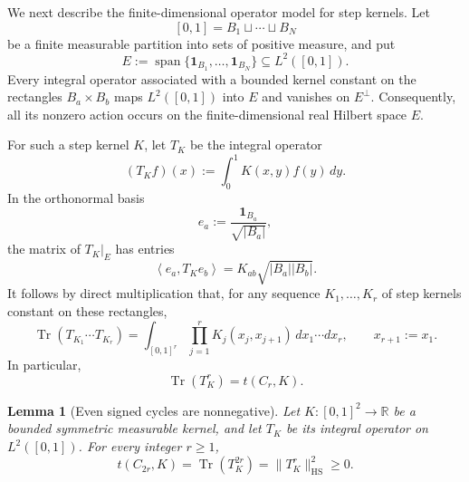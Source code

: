 \documentclass[11pt]{article}
\newtheorem{lemma}[theorem]{Lemma}
\newcommand{\R}{\mathbb{R}}
\newcommand{\one}{\mathbf{1}}
\newcommand{\ip}[2]{\left\langle #1,#2\right\rangle}
\newcommand{\Tr}{\operatorname{Tr}}
\newcommand{\HS}{\mathrm{HS}}
\begin{document}
We next describe the finite-dimensional operator model for step
kernels.  Let
\[
  [0,1]=B_1\sqcup\cdots\sqcup B_N
\]
be a finite measurable partition into sets of positive measure, and put
\[
  E:=\operatorname{span}\{\one_{B_1},\ldots,\one_{B_N}\}
  \subseteq L^2([0,1]).
\]
Every integral operator associated with a bounded kernel constant on
the rectangles $B_a\times B_b$ maps $L^2([0,1])$ into $E$ and vanishes
on $E^\perp$.  Consequently, all its nonzero action occurs on the
finite-dimensional real Hilbert space $E$.

For such a step kernel $K$, let $T_K$ be the integral operator
\[
  (T_Kf)(x):=\int_0^1K(x,y)f(y)\,dy.
\]
In the orthonormal basis
\[
  e_a:=\frac{\one_{B_a}}{\sqrt{|B_a|}},
\]
the matrix of $T_K|_E$ has entries
\[
  \ip{e_a}{T_Ke_b}=K_{ab}\sqrt{|B_a||B_b|}.
\]
It follows by direct multiplication that, for any sequence
$K_1,\ldots,K_r$ of step kernels constant on these rectangles,
\begin{equation}
  \Tr(T_{K_1}\cdots T_{K_r})
  =
  \int_{[0,1]^r}
  \prod_{j=1}^{r}K_j(x_j,x_{j+1})
  \,dx_1\cdots dx_r,
  \qquad x_{r+1}:=x_1.
  \label{eq:mixed-trace}
\end{equation}
In particular,
\begin{equation}
  \Tr(T_K^r)=t(C_r,K).
  \label{eq:cycle-trace}
\end{equation}

\begin{lemma}[Even signed cycles are nonnegative]
\label{lem:even-signed-cycle}
Let $K\colon[0,1]^2\to\R$ be a bounded symmetric measurable kernel,
and let $T_K$ be its integral operator on $L^2([0,1])$.  For every
integer $r\ge1$,
\begin{equation}
  t(C_{2r},K)
  =\Tr(T_K^{2r})
  =\|T_K^r\|_{\HS}^2
  \ge0.
  \label{eq:even-cycle-HS}
\end{equation}
\end{lemma}
\end{document}
